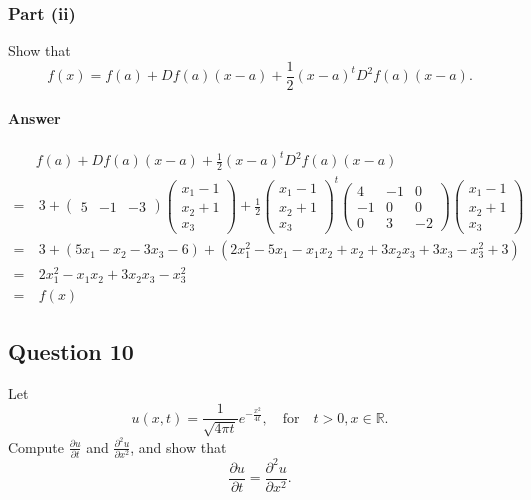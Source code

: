 \subsubsection{Part (ii)}
Show that
\begin{equation}
    f(x) = f(a) + D f(a) (x - a) + \frac{1}{2} (x - a)^t D^2 f(a) (x - a).
    \label{eq:exercise:ch1-q9ii}
\end{equation}

\paragraph{Answer}
\begin{align*}
    &f(a) + D f(a) (x - a) + \frac{1}{2} (x - a)^t D^2 f(a) (x - a) \\
    =&\ 3 +
    \begin{pmatrix}
        5 & -1 & -3
    \end{pmatrix}
    \begin{pmatrix}
        x_1 - 1 \\
        x_2 + 1 \\
        x_3
    \end{pmatrix}
    + \frac{1}{2}
    \begin{pmatrix}
        x_1 - 1 \\
        x_2 + 1 \\
        x_3
    \end{pmatrix}^t
    \begin{pmatrix}
        4 & -1 & 0 \\
        -1 & 0 & 0 \\
        0 & 3 & -2
    \end{pmatrix}
    \begin{pmatrix}
        x_1 - 1 \\
        x_2 + 1 \\
        x_3
    \end{pmatrix} \\
    =&\ 3 + (5 x_1 - x_2 - 3 x_3 - 6) + (2 x_1^2 - 5 x_1 - x_1 x_2 + x_2 +
        3 x_2 x_3 + 3 x_3 - x_3^2 + 3) \\
    =&\ 2 x_1^2 - x_1 x_2 + 3 x_2 x_3 - x_3^2 \\
    =&\ f(x)
\end{align*}

\subsection{Question 10}
Let
\begin{equation*}
    u(x, t) = \frac{1}{\sqrt{4 \pi t}} e^{-\frac{x^2}{4 t}}, \quad \text{for}
        \quad t > 0, x \in \mathbb{R}.
\end{equation*}
Compute $ \frac{\partial u}{\partial t} $ and
    $ \frac{\partial^2 u}{\partial x^2} $, and show that
\begin{equation*}
    \frac{\partial u}{\partial t} = \frac{\partial^2 u}{\partial x^2}.
\end{equation*}

